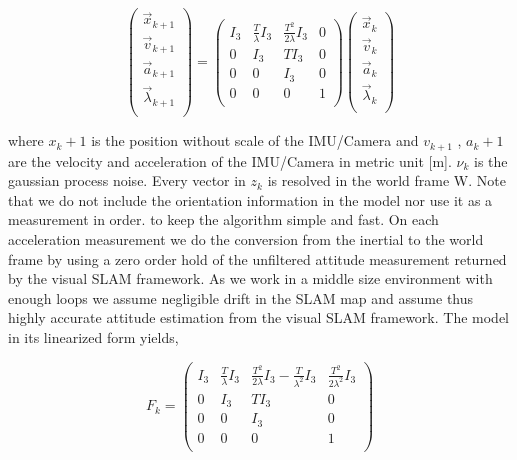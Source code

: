 \begin{equation} 
\begin{pmatrix}
  \overrightarrow{x}_{k+1} \\
  \overrightarrow{v}_{k+1} \\
  \overrightarrow{a}_{k+1} \\
  \overrightarrow{\lambda}_{k+1} \\
 \end{pmatrix}
 =
 \begin{pmatrix}
  I_3 & \frac{T}{\lambda}I_3  & \frac{T^2}{2 \lambda} I_3 & 0\\
  0 & I_3 & T I_3 & 0 \\
  0 & 0 & I_3 & 0 \\
  0 & 0 & 0 & 1\\
 \end{pmatrix} 
\begin{pmatrix}
\overrightarrow{x}_{k} \\
  \overrightarrow{v}_{k} \\
  \overrightarrow{a}_{k} \\
  \overrightarrow{\lambda}_{k} \\
 \end{pmatrix}
\end{equation}

where $x_k+1$ is the position without scale of the IMU/Camera and $v_{k+1}$ , $a_k+1$ are the velocity and acceleration of the IMU/Camera in metric unit [m]. $ν_k$ is the gaussian process noise. 
Every vector in $z_k$ is resolved in the world frame W. Note that we do not
include the orientation information in the model nor use it as a measurement in order. to keep the algorithm simple and fast. On each acceleration measurement we do the conversion from the inertial to the world frame by using a zero order hold  of the unfiltered attitude measurement returned by the visual SLAM framework. As we work in a middle size environment with enough loops we assume negligible drift in the SLAM map and assume thus highly accurate attitude estimation from the visual SLAM framework. The model in its linearized form yields,

\begin{equation} 
F_k= 
 \begin{pmatrix}
  I_3 & \frac{T}{\lambda}I_3  & \frac{T^2}{2 \lambda} I_3-\frac{T}{ \lambda^2} I_3 & \frac{T^2}{ 2 \lambda^2} I_3\\
  0 & I_3 & T I_3 & 0 \\
  0 & 0 & I_3 & 0 \\
  0 & 0 & 0 & 1\\
 \end{pmatrix} 
\end{equation}

